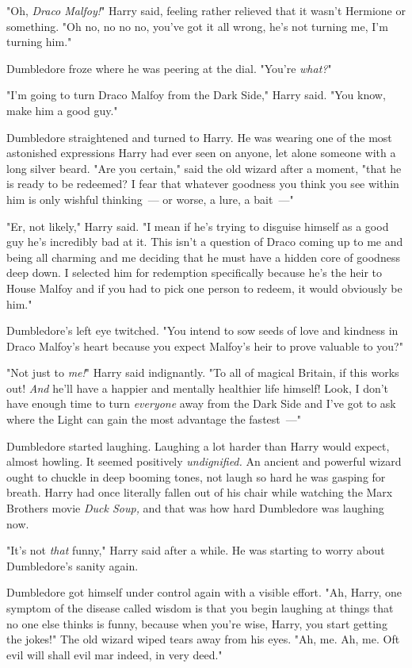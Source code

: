 "Oh, \emph{Draco Malfoy!}" Harry said, feeling rather relieved that it wasn't
Hermione or something. "Oh no, no no no, you've got it all wrong, he's not
turning me, I'm turning him."

Dumbledore froze where he was peering at the dial. "You're \emph{what?}"

"I'm going to turn Draco Malfoy from the Dark Side," Harry said. "You know,
make him a good guy."

Dumbledore straightened and turned to Harry. He was wearing one of the most
astonished expressions Harry had ever seen on anyone, let alone someone with a
long silver beard. "Are you certain," said the old wizard after a moment, "that
he is ready to be redeemed? I fear that whatever goodness you think you see
within him is only wishful thinking~--- or worse, a lure, a bait~---"

"Er, not likely," Harry said. "I mean if he's trying to disguise himself as a
good guy he's incredibly bad at it. This isn't a question of Draco coming up to
me and being all charming and me deciding that he must have a hidden core of
goodness deep down. I selected him for redemption specifically because he's the
heir to House Malfoy and if you had to pick one person to redeem, it would
obviously be him."

Dumbledore's left eye twitched. "You intend to sow seeds of love and kindness
in Draco Malfoy's heart because you expect Malfoy's heir to prove valuable to
you?"

"Not just to \emph{me!}" Harry said indignantly. "To all of magical Britain, if
this works out! \emph{And} he'll have a happier and mentally healthier life
himself! Look, I don't have enough time to turn \emph{everyone} away from the
Dark Side and I've got to ask where the Light can gain the most advantage the
fastest~---"

Dumbledore started laughing. Laughing a lot harder than Harry would expect,
almost howling. It seemed positively \emph{undignified.} An ancient and
powerful wizard ought to chuckle in deep booming tones, not laugh so hard he
was gasping for breath. Harry had once literally fallen out of his chair while
watching the Marx Brothers movie \emph{Duck Soup,} and that was how hard
Dumbledore was laughing now.

"It's not \emph{that} funny," Harry said after a while. He was starting to
worry about Dumbledore's sanity again.

Dumbledore got himself under control again with a visible effort. "Ah, Harry,
one symptom of the disease called wisdom is that you begin laughing at things
that no one else thinks is funny, because when you're wise, Harry, you start
getting the jokes!" The old wizard wiped tears away from his eyes. "Ah, me. Ah,
me. Oft evil will shall evil mar indeed, in very deed."


